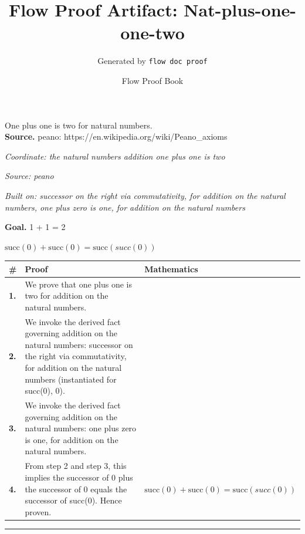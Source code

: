 \documentclass[11pt]{article}
\title{Flow Proof Artifact: Nat-plus-one-one-two}
\author{Generated by \texttt{flow doc proof}}
\date{Flow Proof Book}
\theoremstyle{definition}
\begin{document}
\maketitle
One plus one is two for natural numbers.\\[0.5em]
\textbf{Source.} peano: https://en.wikipedia.org/wiki/Peano\_axioms\\[0.5em]
\bigskip
{}\par
\smallskip\noindent\textit{Coordinate: the natural numbers \cdot addition \cdot one plus one is two}\par
\smallskip\noindent\textit{Source: peano}\par
\smallskip\noindent\textit{Built on: successor on the right via commutativity, for addition on the natural numbers, one plus zero is one, for addition on the natural numbers}\par
\medskip
\noindent\textbf{Goal.} 1 + 1 = 2\par
\noindent$\displaystyle \mathrm{succ}(0) + \mathrm{succ}(0) = \mathrm{succ}(succ(0))$\par
\medskip
\noindent
\begin{tabular}{@{} >{\raggedright\arraybackslash}p{} >{\raggedright\arraybackslash}p{} >{\raggedleft\arraybackslash}p{} @{}}
\textbf{\#} & \textbf{Proof} & \textbf{Mathematics} \\
\midrule
\textbf{1.} & We prove that one plus one is two for addition on the natural numbers. & \\[0.45em]
\textbf{2.} & We invoke the derived fact governing addition on the natural numbers: successor on the right via commutativity, for addition on the natural numbers (instantiated for succ(0), 0). & \\[0.45em]
\textbf{3.} & We invoke the derived fact governing addition on the natural numbers: one plus zero is one, for addition on the natural numbers. & \\[0.45em]
\textbf{4.} & From step 2 and step 3, this implies the successor of 0 plus the successor of 0 equals the successor of succ(0). Hence proven. & $\displaystyle \mathrm{succ}(0) + \mathrm{succ}(0) = \mathrm{succ}(succ(0))$ \\[0.45em]
\bottomrule
\end{tabular}
\label{thm:Nat-addition-one_plus_one_is_two}
\par\medskip\hrule
\end{document}

